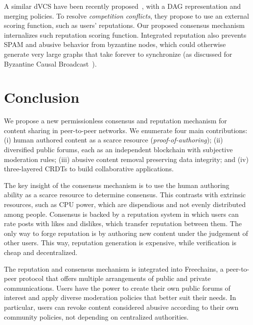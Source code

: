 \documentclass[10pt,journal,compsoc]{IEEEtran}
\newcommand{\FC}       {Freechains\xspace}
\begin{document}
A similar dVCS have been recently proposed~\cite{p2p.dvcs}, with a DAG
representation and merging policies.
To resolve \emph{competition conflicts}, they propose to use an external
scoring function, such as users' reputations.
Our proposed consensus mechanism internalizes such reputation scoring function.
Integrated reputation also prevents SPAM and abusive behavior from byzantine
nodes, which could otherwise generate very large graphs that take forever to
synchronize (as discussed for Byzantine Causal Broadcast~\cite{p2p.dag.sync}).

\section{Conclusion}
\label{sec.conclusion}

We propose a new permissionless consensus and reputation mechanism for content
sharing in peer-to-peer networks.
We enumerate four main contributions:
    (i)   human authored content as a scarce resource
          (\emph{proof-of-authoring});
    (ii)  diversified public forums, each as an independent blockchain with
          subjective moderation rules;
    (iii) abusive content removal preserving data integrity; and
    (iv)  three-layered CRDTs to build collaborative applications.

The key insight of the consensus mechanism is to use the human authoring
ability as a scarce resource to determine consensus.
This contrasts with extrinsic resources, such as CPU power, which are
dispendious and not evenly distributed among people.
%
Consensus is backed by a reputation system in which users can rate posts with
likes and dislikes, which transfer reputation between them.
The only way to forge reputation is by authoring new content under the
judgement of other users.
This way, reputation generation is expensive, while verification is cheap and
decentralized.

The reputation and consensus mechanism is integrated into \FC, a peer-to-peer
protocol that offers multiple arrangements of public and private
communications.
Users have the power to create their own public forums of interest and apply
diverse moderation policies that better suit their needs.
In particular, users can revoke content considered abusive according to their
own community policies, not depending on centralized authorities.

\end{document}
